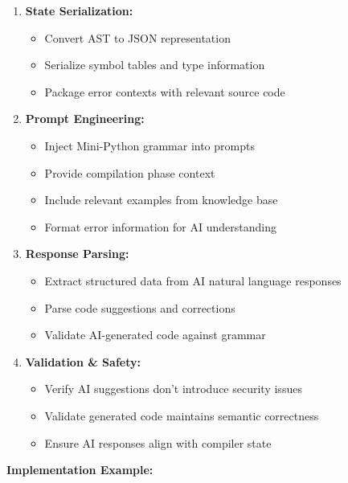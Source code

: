 \documentclass[a4paper,11pt]{article}
\begin{document}
\begin{enumerate}
    \item \textbf{State Serialization:}
    \begin{itemize}[leftmargin=*]
        \item Convert AST to JSON representation
        \item Serialize symbol tables and type information
        \item Package error contexts with relevant source code
    \end{itemize}
    
    \item \textbf{Prompt Engineering:}
    \begin{itemize}[leftmargin=*]
        \item Inject Mini-Python grammar into prompts
        \item Provide compilation phase context
        \item Include relevant examples from knowledge base
        \item Format error information for AI understanding
    \end{itemize}
    
    \item \textbf{Response Parsing:}
    \begin{itemize}[leftmargin=*]
        \item Extract structured data from AI natural language responses
        \item Parse code suggestions and corrections
        \item Validate AI-generated code against grammar
    \end{itemize}
    
    \item \textbf{Validation \& Safety:}
    \begin{itemize}[leftmargin=*]
        \item Verify AI suggestions don't introduce security issues
        \item Validate generated code maintains semantic correctness
        \item Ensure AI responses align with compiler state
    \end{itemize}
\end{enumerate}

\textbf{Implementation Example:}
\end{document}
